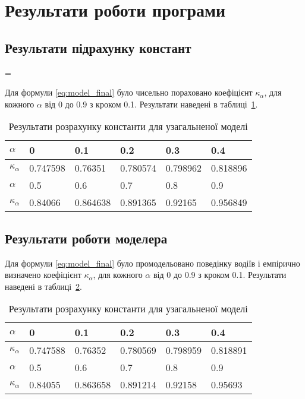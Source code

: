\section{Результати роботи програми}
\label{sec:result_analyse}
\jointitles
\subsection{Результати підрахунку констант}
=

Для формули \eqref{eq:model_final} було чисельно пораховано коефіцієнт $\kappa_\alpha$, для кожного $\alpha$ від 0 до 0.9 з кроком 0.1. Результати наведені в таблиці~\ref{tab:model_integral_result}.

\begin{table}[ht]
	\caption{Результати розрахунку константи для узагальненої моделі}
	\centering
\begin{tabular}{|p{}|p{}|p{}|p{}|p{}|p{}|}
	\hline
	$\alpha$ & 0 & 0.1 & 0.2 & 0.3 & 0.4 \\
	\hline
	$\kappa_\alpha$ & 0.747598 &0.76351 &0.780574 &0.798962 &0.818896  \\
	\hline
	\hline
	$\alpha$  & 0.5 & 0.6 & 0.7 & 0.8 & 0.9\\
	\hline
	$\kappa_\alpha$  &0.84066 &0.864638 &0.891365 &0.92165 &0.956849 \\
	\hline
\end{tabular}	
	\label{tab:model_integral_result}
\end{table}

\subsection{Результати роботи моделера}

Для формули \eqref{eq:model_final} було промодельовано поведінку водіїв і емпірично визначено коефіцієнт $\kappa_\alpha$, для кожного $\alpha$ від 0 до 0.9 з кроком 0.1. Результати наведені в таблиці~\ref{tab:model_simulation_result}.

\begin{table}[ht]
	\caption{Результати розрахунку константи для узагальненої моделі}
	\centering
\begin{tabular}{|p{}|p{}|p{}|p{}|p{}|p{}|}
	\hline
	$\alpha$ & 0 & 0.1 & 0.2 & 0.3 & 0.4 \\
	\hline
	$\kappa_\alpha$ & 0.747588 &0.76352 &0.780569 &0.798959 &0.818891  \\
	\hline
	\hline
	$\alpha$  & 0.5 & 0.6 & 0.7 & 0.8 & 0.9\\
	\hline
	$\kappa_\alpha$  &0.84055 &0.863658 &0.891214 &0.92158 &0.95693 \\
	\hline
\end{tabular}	
	\label{tab:model_simulation_result}
\end{table}

